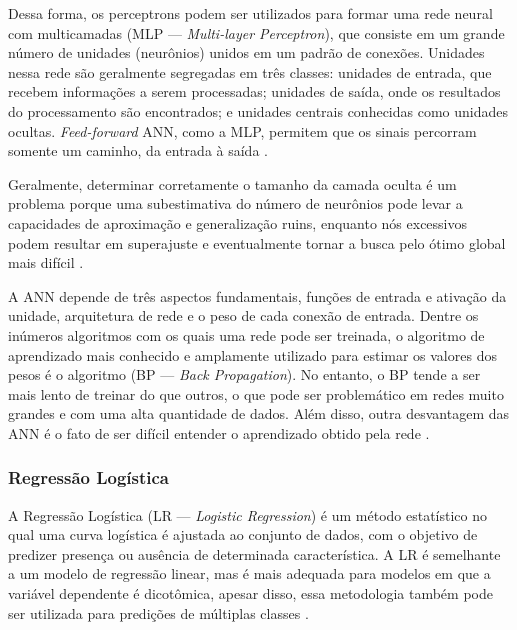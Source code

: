 \documentclass[
	12pt,				%
	oneside,			%
	a4paper,			%
	english,			%
	brazil				%
	]{abntex2ppgsi}
\begin{document}
{Dessa forma, os perceptrons podem ser utilizados para formar uma rede neural com multicamadas (MLP --- \textit{Multi-layer Perceptron}), que consiste em um grande número de unidades (neurônios) unidos em um padrão de conexões. Unidades nessa rede são geralmente segregadas em três classes: unidades de entrada, que recebem informações a serem processadas; unidades de saída, onde os resultados do processamento são encontrados; e unidades centrais conhecidas como unidades ocultas. \textit{Feed-forward} ANN, como a MLP, permitem que os sinais percorram somente um caminho, da entrada à saída  \cite{kotsiantis2006machine}.

Geralmente, determinar corretamente o tamanho da camada oculta é um problema porque uma subestimativa do número de neurônios pode levar a capacidades de aproximação e generalização ruins, enquanto nós excessivos podem resultar em superajuste e eventualmente tornar a busca pelo ótimo global mais difícil  \cite{kotsiantis2006machine}.

A ANN depende de três aspectos fundamentais, funções de entrada e ativação da unidade, arquitetura de rede e o peso de cada conexão de entrada. Dentre os inúmeros  algoritmos com os quais uma rede pode ser treinada, o algoritmo de aprendizado mais conhecido e amplamente utilizado para estimar os valores dos pesos é o algoritmo (BP --- \textit{Back Propagation}). No entanto, o BP tende a ser mais lento de treinar do que outros, o que pode ser problemático em redes muito grandes e com uma alta quantidade de dados. Além disso, outra desvantagem das ANN é o fato de ser difícil entender o aprendizado obtido pela rede \cite{kotsiantis2006machine, singh2016review}.

\subsubsection{Regressão Logística}

A Regressão Logística  (LR --- \textit{Logistic Regression}) é um método estatístico no qual uma curva logística é ajustada ao conjunto de dados, com o objetivo de predizer presença ou ausência de determinada característica. A LR é semelhante a um modelo de regressão linear, mas é mais adequada para modelos em que a variável dependente é dicotômica, apesar disso, essa metodologia também pode ser utilizada para predições de múltiplas classes \cite{schein2007active, kurt2008comparing, singh2016review}. 

}
\end{document}
